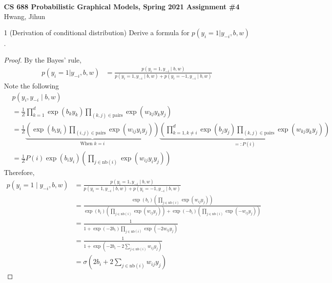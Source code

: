 \documentclass[12pt]{article}
\begin{document}
\noindent \textbf{CS 688 Probabilistic Graphical Models, Spring 2021 \hfill Assignment \#4}\\
\; \hfill Hwang, Jihun

\hrulefill

\begin{problem}{1 (Derivation of conditional distribution)}
Derive a formula for $p(y_i=1|y_{-i}, b, w)$.
\end{problem}

\newcommand{\nb}[1]{\mathrm{nb}(#1)}
\newcommand{\pairs}{\mathrm{pairs}}

\begin{proof}
By the Bayes' rule,
\begin{align*}
    p(y_i=1|y_{-i}, b, w)
    & = \frac{p(y_i=1, y_{-i} \mid  b, w)}{p(y_i=1, y_{-i} \mid  b, w) + p(y_i=-1, y_{-i} \mid  b, w)}
\end{align*}
Note the following
\begin{align*}
    & p(y_i, y_{-i} \mid  b, w) \\
    & = \frac{1}{Z} \prod_{k=1}^d \exp(b_k y_k) \prod_{(k,j) \in \pairs} \exp(w_{kj} y_k y_j) \\
    & = \frac{1}{Z} \underbrace{\left(\exp(b_i y_i) \prod_{(i, j) \in \pairs} \exp(w_{ij} y_i y_j) \right)}_{\text{When } k = i} \underbrace{\left( \prod_{k=1, k\neq i}^d \exp(b_j y_j) \prod_{(k,j) \in \pairs} \exp(w_{kj} y_k y_j) \right)}_{=: P(i)} \\
    & = \frac{1}{Z} P(i) \exp(b_i y_i) \left(\prod_{j \in \nb{i}} \exp(w_{ij} y_i y_j)\right) 
\end{align*}
Therefore,
\begin{align*}
    p(y_i=1 \mid y_{-i}, b, w)
    & = \frac{p(y_i=1, y_{-i} \mid  b, w)}{p(y_i=1, y_{-i} \mid  b, w) + p(y_i=-1, y_{-i} \mid  b, w)} \\
    & = \frac{\exp(b_i) \left(\prod_{j \in \nb{i}} \exp(w_{ij} y_j)\right)}{\exp(b_i ) \left(\prod_{j \in \nb{i}} \exp(w_{ij} y_j)\right) + \exp(-b_i) \left(\prod_{j \in \nb{i}} \exp(-w_{ij} y_j)\right)} \\
    & = \frac{1}{1+\exp(-2b_i) \prod_{j \in \nb{i}} \exp(-2 w_{ij} y_j)} \\
    & = \frac{1}{1+\exp\left(-2b_i - 2 \sum_{j \in \nb{i}} w_{ij} y_j \right)} \\
    & = \boxed{\sigma\left( 2b_i + 2 \sum_{j \in \nb{i}} w_{ij} y_j \right)}
\end{align*}
\end{proof}
\end{document}

